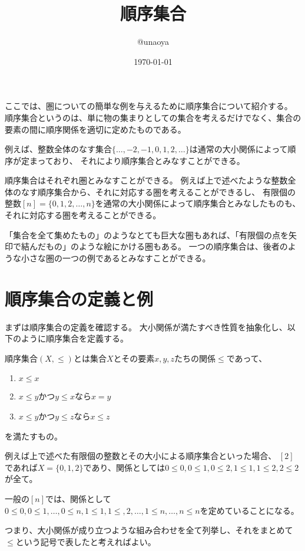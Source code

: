 \documentclass{jsarticle}
\title{順序集合}
\author{@unaoya}
\date{\today}
\begin{document}
\maketitle

ここでは、圏についての簡単な例を与えるために順序集合について紹介する。
順序集合というのは、単に物の集まりとしての集合を考えるだけでなく、集合の要素の間に順序関係を適切に定めたものである。

例えば、整数全体のなす集合$\{\ldots,-2,-1,0, 1, 2, \ldots\}$は通常の大小関係によって順序が定まっており、
それにより順序集合とみなすことができる。

順序集合はそれぞれ圏とみなすことができる。
例えば上で述べたような整数全体のなす順序集合から、それに対応する圏を考えることができるし、
有限個の整数$[n]=\{0,1,2,\ldots,n\}$を通常の大小関係によって順序集合とみなしたものも、それに対応する圏を考えることができる。

「集合を全て集めたもの」のようなとても巨大な圏もあれば、「有限個の点を矢印で結んだもの」のような絵にかける圏もある。
一つの順序集合は、後者のような小さな圏の一つの例であるとみなすことができる。

\section{順序集合の定義と例}

まずは順序集合の定義を確認する。
大小関係が満たすべき性質を抽象化し、以下のように順序集合を定義する。
\begin{dfn}[順序集合]
順序集合$(X,\leq)$とは集合$X$とその要素$x, y, z$たちの関係$\leq$であって、
\begin{enumerate}
\item $x\leq x$
\item $x\leq y$かつ$y\leq x$なら$x=y$
\item $x\leq y$かつ$y\leq z$なら$x\leq z$
\end{enumerate}
を満たすもの。
\end{dfn}

\begin{eg}
例えば上で述べた有限個の整数とその大小による順序集合といった場合、
$[2]$であれば$X=\{0,1,2\}$であり、関係としては$0\leq0,0\leq1,0\leq2,1\leq1,1\leq2,2\leq2$が全て。

一般の$[n]$では、関係として$0\leq 0, 0\leq1,\ldots,0\leq n,1\leq1,1\leq,2,\ldots,1\leq n,\ldots,n\leq n$を定めていることになる。
\end{eg}

つまり、大小関係が成り立つような組み合わせを全て列挙し、それをまとめて$\leq$という記号で表したと考えればよい。
\end{document}
